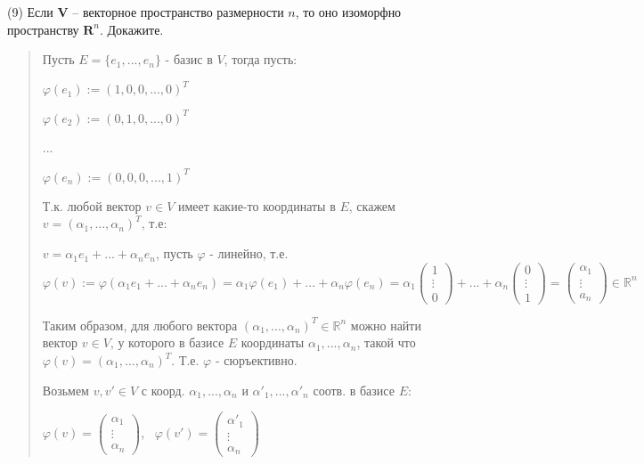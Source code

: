 \documentclass{article}
\begin{document}
(9) Если $\mathbf{V}$ – векторное пространство размерности $n$, то оно изоморфно пространству $\mathbf{R}^n$. Докажите.
\begin{quote}
    Пусть $E = \{ e_1 , ... , e_n \}$ - базис в $V$,
    тогда пусть:

    $\varphi(e_1) := (1, 0, 0, ..., 0)^T$ 
    
    $\varphi(e_2) := (0, 1, 0, ..., 0)^T$ 

    ...
    
    $\varphi(e_n) := (0, 0, 0, ..., 1)^T$ 

    Т.к. любой вектор $v \in V$ имеет какие-то координаты в $E$, скажем $v = (\alpha_1, ... , \alpha_n)^T$, т.е:
    
    $v = \alpha_1 e_1 + ... + \alpha_n e_n$, пусть $\varphi$ - линейно, т.е. $\varphi (v) := \varphi (\alpha_1 e_1 + ... + \alpha_n e_n) = \alpha_1 \varphi (e_1) + ... + \alpha_n \varphi (e_n) = \alpha_1 \begin{pmatrix}
        1 \\ \vdots \\ 0
    \end{pmatrix} + ... + \alpha_n \begin{pmatrix}
        0 \\ \vdots \\ 1
    \end{pmatrix} = \begin{pmatrix}
        \alpha_1 \\ \vdots \\ a_n
    \end{pmatrix} \in \mathbb{R}^n$

    Таким образом, для любого вектора $(\alpha_1, ..., \alpha_n)^T \in \mathbb{R}^n$ можно найти вектор $v \in V$, у которого в базисе $E$ координаты $\alpha_1, ... , \alpha_n$, такой что $\varphi(v) = (\alpha_1, ..., \alpha_n)^T$. Т.е. $\varphi$ - сюръективно.

    Возьмем $v, v' \in V$ с коорд. $\alpha_1, ..., \alpha_n$ и $\alpha'_1, ... , \alpha'_n$ соотв. в базисе $E$:

    $\varphi(v) = \begin{pmatrix}
        \alpha_1 \\ \vdots \\ \alpha_n
    \end{pmatrix}$, \
        $\varphi(v') = \begin{pmatrix}
        \alpha'_1 \\ \vdots \\ \alpha_n
    \end{pmatrix}$


\end{quote}
\end{document}

